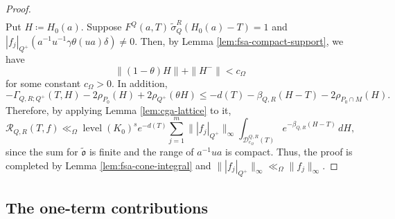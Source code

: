 \documentclass[12pt]{amsart}
\theoremstyle{definition}
\theoremstyle{plain}
\theoremstyle{remark}
\def\R{\mathbb{R}}%
\def\A{\mathbb{A}}%
\def\inf{\infty}
\newcommand{\cD}{\mathcal{D}}
\newcommand{\cR}{\mathcal{R}}
\numberwithin{equation}{section}
\newcommand{\tG}{\widetilde{G}}
\newcommand{\tM}{\widetilde{M}}
\newcommand{\tP}{\widetilde{P}}
\newcommand{\tQ}{\widetilde{Q}}
\newcommand{\tR}{\widetilde{R}}
\newcommand{\talpha}{\widetilde{\alpha}}
\newcommand{\tfo}{\widetilde{\mathfrak{o}}}
\newcommand{\level}{\operatorname{level}}
\begin{document}
\begin{proof}
\begin{align*}
\end{align*}
Put $H\coloneqq H_0(a)$.  
Suppose $F^Q(a,T)\, \widetilde\sigma_Q^R(H_0(a)-T)=1$ and $|f_{j}|_{Q^+}(a^{-1}u^{-1}\gamma\theta(ua)\delta)\neq 0$. 
Then, by Lemma \ref{lem:fsa-compact-support}, we have 
\[
\|(1-\theta)H\|+ \|H^-\|<c_\Omega
\]
for some constant $c_\Omega>0$. 
In addition, 
\[
-\Gamma_{Q,R;Q^+}(T,H)-2\rho_{P_0}(H)+ 2\rho_{Q^+}(\theta H)\le  -d(T)-\beta_{Q,R}(H-T)-2\rho_{P_0\cap M}(H).
\]
Therefore, by applying Lemma \ref{lem:cga-lattice} to it,
\[
\cR_{Q,R}(T,f)\ll_\Omega \level(K_0)^{s} e^{-d(T)}  \sum_{j=1}^m  \||f_j|_{Q^+}\|_{\infty}  \int_{\cD^{Q,R}_{c_\Omega}(T)}    e^{-\beta_{Q,R}(H-T)}  \, dH,
\]
since the sum for $\tfo$ is finite and the range of $a^{-1}ua$ is compact. 
Thus, the proof is completed by Lemma \ref{lem:fsa-cone-integral} and $\||f_j|_{Q^+}\|_{\infty}\ll_\Omega \|f_j\|_\inf$. 
\end{proof}





\subsection{The one-term contributions}
\end{document}
